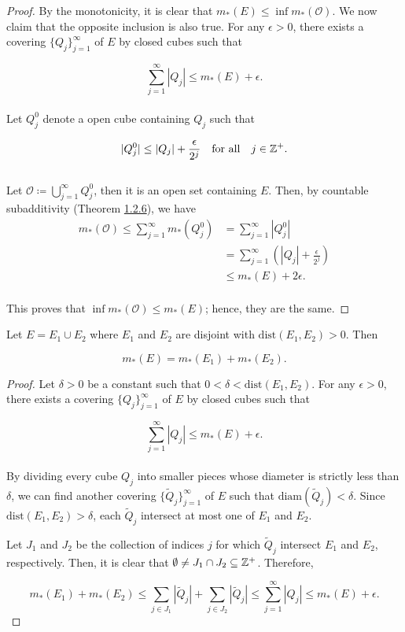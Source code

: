 \documentclass[12pt, a4paper, openany, twoside]{book}
\theoremstyle{definition}
\theoremstyle{remark}
\theoremstyle{plain}
\numberwithin{equation}{section}
\begin{document}
\begin{proof}
    By the monotonicity, it is clear that $m_*(E)\leq\inf{m_*(\mathcal{O})}$. We now claim that the opposite inclusion is also true. For any $\epsilon>0$, there exists a covering $\{Q_j\}_{j=1}^{\infty}$ of $E$ by closed cubes such that

    \[\sum_{j=1}^{\infty}{|Q_j|}\leq m_*(E)+\epsilon.\]
    \\
    Let $Q_j^0$ denote a open cube containing $Q_j$ such that 

    \[|Q_j^0|\leq |Q_j|+\frac{\epsilon}{2^j}\quad\text{for all}\quad j\in{\mathbb {Z}}^+.\]
    \\
    Let $\mathcal{O}\coloneqq\bigcup_{j=1}^{\infty}{Q_j^0}$, then it is an open set containing $E$. Then, by countable subadditivity (Theorem \hyperref[Theorem 1.2.6]{1.2.6}), we have
    \begin{align*}
        m_*(\mathcal{O})\leq \sum_{j=1}^{\infty}{m_*(Q_j^0)}&=\sum_{j=1}^{\infty}{|Q_j^0|}\\
        &=\sum_{j=1}^{\infty}{\left(|Q_j|+\frac{\epsilon}{2^j}\right)}\\
        &\leq m_*(E)+2\epsilon. 
    \end{align*}
    \\
    This proves that $\inf{m_*(\mathcal{O})}\leq m_*(E)$; hence, they are the same.
\end{proof}
\vspace{5mm}
\begin{tcolorbox}[colback=yellow!10!white,colframe=red!75!black,title=Theorem 1.2.8]\label{Theorem 1.2.8}
    Let $E=E_1\cup E_2$ where $E_1$ and $E_2$ are disjoint with $\mathrm{dist}(E_1,E_2)>0$. Then 

    \[m_*(E)=m_*(E_1)+m_*(E_2).\]
\end{tcolorbox}
\begin{proof}
    Let $\delta>0$ be a constant such that $0<\delta<\mathrm{dist}(E_1,E_2)$. For any $\epsilon>0$, there exists a covering $\{Q_j\}_{j=1}^{\infty}$ of $E$ by closed cubes such that 

    \[\sum_{j=1}^{\infty}{|Q_j|}\leq m_*(E)+\epsilon.\]
    \\
    By dividing every cube $Q_j$ into smaller pieces whose diameter is strictly less than $\delta$, we can find another covering $\{\tilde{Q}_j\}_{j=1}^{\infty}$ of $E$ such that $\mathrm{diam}(\tilde{Q}_j)<\delta$. Since $\mathrm{dist}(E_1,E_2)>\delta$, each $\tilde{Q}_j$ intersect at most one of $E_1$ and $E_2$. 

    Let $J_1$ and $J_2$ be the collection of indices $j$ for which $\tilde{Q}_j$ intersect $E_1$ and $E_2$, respectively. Then, it is clear that $\emptyset\neq J_1\cap J_2\subseteq{\mathbb {Z}}^+$. Therefore,

    \[m_*(E_1)+m_*(E_2)\leq \sum_{j\in J_1}{|\tilde{Q}_j|}+\sum_{j\in J_2}{|\tilde{Q}_j|}\leq \sum_{j=1}^{\infty}{|Q_j|}\leq m_*(E)+\epsilon.\]
\end{proof}
\end{document}
